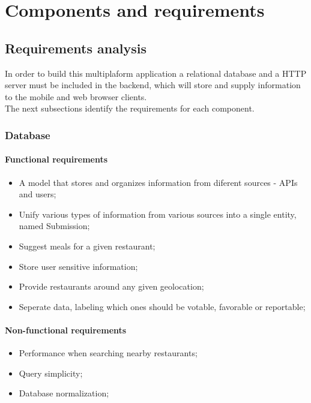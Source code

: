 %
%

\chapter{Components and requirements}

\section{Requirements analysis}

In order to build this multiplaform application a relational database and a HTTP server must be included
in the backend, which will store and supply information to the mobile and web browser clients.\\

The next subsections identify the requirements for each component.

\subsection{Database}

\subsubsection{Functional requirements}

\begin{itemize}
    \item A model that stores and organizes information from diferent sources - APIs and users;
    \item Unify various types of information from various sources into a single entity, named Submission;
    \item Suggest meals for a given restaurant;
    \item Store user sensitive information;
    \item Provide restaurants around any given geolocation;
    \item Seperate data, labeling which ones should be votable, favorable or reportable;
\end{itemize}

\subsubsection{Non-functional requirements}

\begin{itemize}
    \item Performance when searching nearby restaurants;
    \item Query simplicity;
    \item Database normalization;
\end{itemize}

